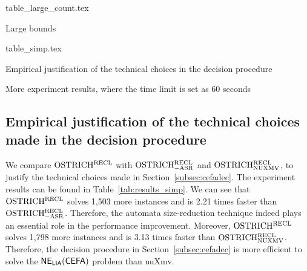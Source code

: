 \begin{table}
\vspace{-2mm}
  \centering
  \begin{subtable}{0.53\textwidth}
      \centering
    {table_large_count.tex}
      \caption{Large bounds}
      \label{tab:large-bound}
  \end{subtable}
  \begin{subtable}{0.45\textwidth}
      \centering
      {table_simp.tex}
      \caption{Empirical justification of the technical choices in the decision procedure}
      \label{tab:results_simp}
  \end{subtable}
  \caption{More experiment results, where the time limit is set as 60 seconds}
\vspace{-8mm}
\end{table}


\subsection{Empirical justification of the technical choices made in the decision procedure}\label{subsec:size_reduction_eval}
%
We compare $\rm OSTRICH^{RECL}$ with $\rm OSTRICH^{RECL}_{\rm -ASR}$ and $\rm OSTRICH^{RECL}_{\rm NUXMV}$, to justify the technical choices made in Section~\ref{subsec:cefadec}. 
The experiment results can be found in Table~\ref{tab:results_simp}. 
We can see that $\rm OSTRICH^{RECL}$ solves 1,503 more instances and is 2.21 times faster than $\rm OSTRICH^{RECL}_{\rm -ASR}$. Therefore, the automata size-reduction technique indeed plays an essential role in the performance improvement. 
Moreover, $\rm OSTRICH^{RECL}$ solves 1,798 more instances and is 3.13 times faster than $\rm OSTRICH^{RECL}_{\rm NUXMV}$. Therefore, the decision procedure in Section~\ref{subsec:cefadec} is more efficient to solve the ${\sf NE_{LIA}(CEFA)}$ problem than nuXmv. 

